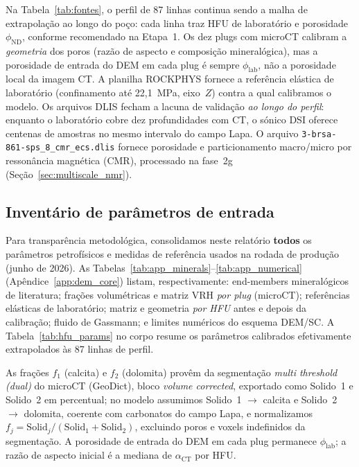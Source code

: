 \documentclass[11pt,a4paper]{article}
\numberwithin{equation}{section}
\newcommand{\philab}{\ensuremath{\phi_{\mathrm{lab}}}}
\newcommand{\phiND}{\ensuremath{\phi_{\mathrm{ND}}}}
\begin{document}
Na Tabela~\ref{tab:fontes}, o perfil de 87 linhas continua sendo a malha de extrapolação ao longo do
poço: cada linha traz HFU de laboratório e porosidade \phiND{}, conforme
recomendado na Etapa~1.
Os dez plugs com microCT calibram a \emph{geometria} dos poros (razão de
aspecto e composição mineralógica), mas a porosidade de entrada do DEM
em cada plug é sempre \philab{}, não a porosidade local da imagem CT.
A planilha ROCKPHYS fornece a referência elástica de laboratório
(confinamento até 22,1~MPa, eixo~$Z$) contra a qual calibramos o modelo.
Os arquivos DLIS fecham a lacuna de validação \emph{ao longo do perfil}:
enquanto o laboratório cobre dez profundidades com CT, o sónico DSI
oferece centenas de amostras no mesmo intervalo do campo Lapa.
O arquivo \texttt{3-brsa-861-sps\_8\_cmr\_ecs.dlis} fornece porosidade e
particionamento macro/micro por ressonância magnética (CMR), processado na
fase~2g (Seção~\ref{sec:multiscale_nmr}).

\subsection{Inventário de parâmetros de entrada}
\label{sec:parametros}

Para transparência metodológica, consolidamos neste relatório \textbf{todos}
os parâmetros petrofísicos e medidas de referência usados na rodada de
produção (junho de 2026).
As Tabelas~\ref{tab:app_minerals}--\ref{tab:app_numerical} (Apêndice~\ref{app:dem_core})
listam, respectivamente: end-members mineralógicos de literatura; frações
volumétricas e matriz VRH \emph{por plug} (microCT); referências elásticas
de laboratório; matriz e geometria \emph{por HFU} antes e depois da
calibração; fluido de Gassmann; e limites numéricos do esquema DEM/SC.
A Tabela~\ref{tab:hfu_params} no corpo resume os parâmetros calibrados
efetivamente extrapolados às 87 linhas de perfil.

As frações $f_1$ (calcita) e $f_2$ (dolomita) provêm da segmentação
\textit{multi threshold (dual)} do microCT (GeoDict), bloco
\textit{volume corrected}, exportado como Solido~1 e Solido~2 em percentual;
no modelo assumimos Solido~1 $\rightarrow$ calcita e Solido~2 $\rightarrow$
dolomita, coerente com carbonatos do campo Lapa, e normalizamos
$f_j = \mathrm{Solid}_j / (\mathrm{Solid}_1 + \mathrm{Solid}_2)$,
excluindo poros e voxels indefinidos da segmentação.
A porosidade de entrada do DEM em cada plug permanece \philab{}; a razão de
aspecto inicial é a mediana de $\alpha_{\mathrm{CT}}$ por HFU.
\end{document}
